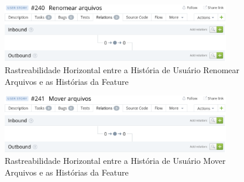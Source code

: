   \begin{figure}[!htb]
    \centering
    \includegraphics[width=10cm, keepaspectratio=false]{figuras/rastreabilidade/horizontal/personalizar_banco/historia_renomear.eps}
    \caption{Rastreabilidade Horizontal entre a História de Usuário Renomear Arquivos e as Histórias da Feature}
  \end{figure}

  \begin{figure}[!htb]
    \centering
    \includegraphics[width=10cm, keepaspectratio=false]{figuras/rastreabilidade/horizontal/personalizar_banco/historia_mover.eps}
    \caption{Rastreabilidade Horizontal entre a História de Usuário Mover Arquivos e as Histórias da Feature}
  \end{figure}

